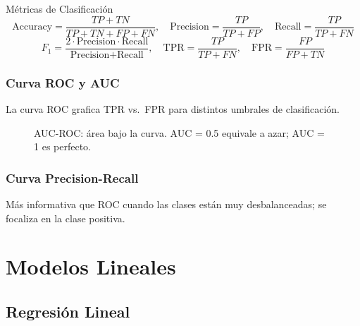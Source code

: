 \documentclass[12pt, a4paper]{article}
\begin{document}
\begin{defbox}{Métricas de Clasificación}
	\[
		\text{Accuracy} = \frac{TP+TN}{TP+TN+FP+FN}, \quad
		\text{Precision} = \frac{TP}{TP+FP}, \quad
		\text{Recall} = \frac{TP}{TP+FN}
	\]
	\[
		F_1 = \frac{2 \cdot \text{Precision} \cdot \text{Recall}}{\text{Precision}+\text{Recall}}, \quad
		\text{TPR} = \frac{TP}{TP+FN}, \quad
		\text{FPR} = \frac{FP}{FP+TN}
	\]
\end{defbox}

\subsubsection{Curva ROC y AUC}
La curva ROC grafica TPR vs.\ FPR para distintos umbrales de clasificación.

\begin{figure}[H]
	\centering
	\caption{AUC-ROC: área bajo la curva. AUC = 0.5 equivale a azar; AUC = 1 es perfecto.}
\end{figure}

\subsubsection{Curva Precision-Recall}
Más informativa que ROC cuando las clases están muy desbalanceadas; se focaliza en la
clase positiva.

\section{Modelos Lineales}

\subsection{Regresión Lineal}
\end{document}
